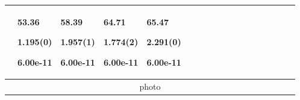 \begin{longtable}{|p{0.01cm}|p{0.25cm}p{0.25cm}p{0.25cm}p{0.25cm}p{0.25cm}p{0.25cm}p{0.25cm}p{0.25cm}p{0.25cm}p{0.25cm}p{0.25cm}p{0.25cm}p{0.25cm}p{0.25cm}p{0.25cm}p{0.25cm}p{0.25cm}|}
}} & \par{\tiny \parbox{1cm}{\hspace{-0.17cm}53.36}}\par{\tiny \parbox{1cm}{\hspace{-0.17cm}1.195(0)}}\par{\tiny \parbox{1cm}{\hspace{-0.17cm}6.00e-11}} & \par{\tiny \parbox{1cm}{\hspace{-0.17cm}58.39}}\par{\tiny \parbox{1cm}{\hspace{-0.17cm}1.957(1)}}\par{\tiny \parbox{1cm}{\hspace{-0.17cm}6.00e-11}} & \par{\tiny \parbox{1cm}{\hspace{-0.17cm}64.71}}\par{\tiny \parbox{1cm}{\hspace{-0.17cm}1.774(2)}}\par{\tiny \parbox{1cm}{\hspace{-0.17cm}6.00e-11}} & \par{\tiny \parbox{1cm}{\hspace{-0.17cm}65.47}}\par{\tiny \parbox{1cm}{\hspace{-0.17cm}2.291(0)}}\par{\tiny \parbox{1cm}{\hspace{-0.17cm}6.00e-11}}\\
\hline\hline \multicolumn{18}{|c|}{\tiny{photo}} \\

\end{longtable}
